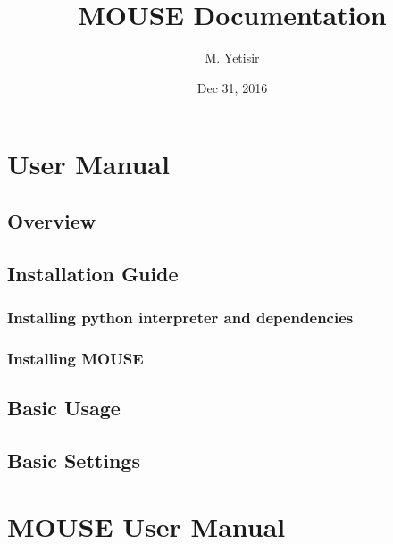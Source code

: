 \documentclass[letterpaper,10pt,english]{sphinxmanual}
\title{MOUSE Documentation}
\date{Dec 31, 2016}
\author{M. Yetisir}
\begin{document}
\maketitle
\sphinxtableofcontents
{}\label{\detokenize{index::doc}}



\chapter{User Manual}
\label{\detokenize{UserManual:user-manual}}\label{\detokenize{UserManual::doc}}\label{\detokenize{UserManual:welcome-to-mouse-s-documentation}}

\section{Overview}
\label{\detokenize{UserManual:overview}}

\section{Installation Guide}
\label{\detokenize{UserManual:installation-guide}}

\subsection{Installing python interpreter and dependencies}
\label{\detokenize{UserManual:installing-python-interpreter-and-dependencies}}

\subsection{Installing MOUSE}
\label{\detokenize{UserManual:installing-mouse}}

\section{Basic Usage}
\label{\detokenize{UserManual:basic-usage}}

\section{Basic Settings}
\label{\detokenize{UserManual:basic-settings}}

\chapter{MOUSE User Manual}
\label{\detokenize{MouseReferenceManual:mouse-user-manual}}\label{\detokenize{MouseReferenceManual::doc}}
\end{document}
